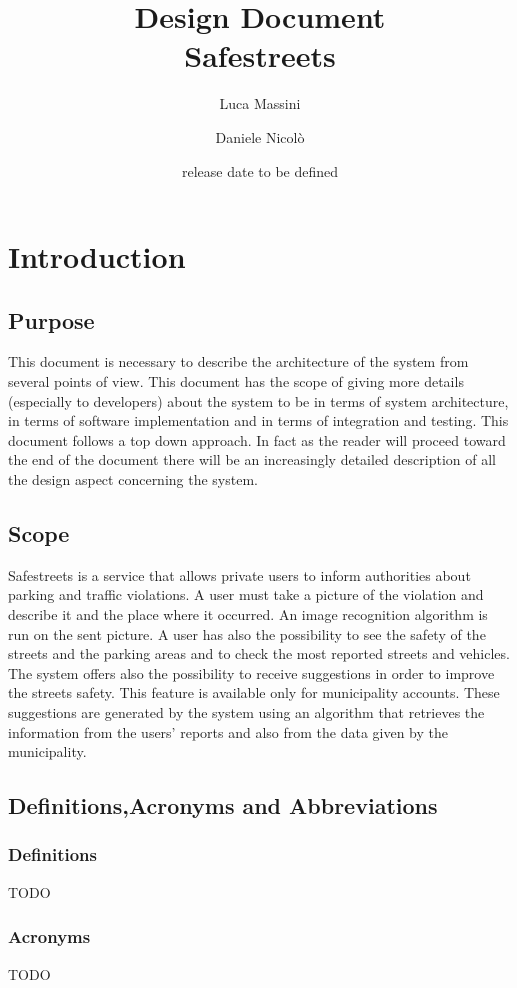 \documentclass[titlepage]{article}
\author{Luca Massini \and Daniele Nicolò}
\title{Design Document
\\  Safestreets}
\date{release date to be defined}
\begin{document}
\maketitle
\newpage 
\tableofcontents
\newpage
\section{Introduction}
\subsection{Purpose}
	This document is necessary to describe the architecture of the system from several points of view. This document has the scope of giving more details (especially to developers) about the system to be in terms of system architecture, in terms of software implementation and in terms of integration and testing. This document follows a top down approach. In fact as the reader will proceed toward the end of the document there will be an increasingly detailed description of all the design aspect concerning the system.
\subsection{Scope}
Safestreets is a service that allows private users to inform authorities about parking and traffic violations. A user must take a picture of the violation and describe it and the place where it occurred. An image recognition algorithm is run on the sent picture. A user has also the possibility to see the safety of the streets and the parking areas and to check the most reported streets and vehicles. \\
The system offers also the possibility to receive suggestions in order to improve the streets safety. This feature is available only for municipality accounts. These  suggestions are generated by the system using an algorithm that retrieves the information from the users' reports and also from the data given by the municipality.
\subsection{Definitions,Acronyms and Abbreviations}
\subsubsection{Definitions}
TODO
\subsubsection{Acronyms}
TODO
\end{document}
